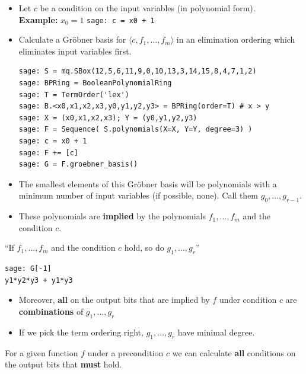 \documentclass[9pt]{beamer}
\begin{document}
\begin{frame}
\framebreak

\begin{itemize}
\item Let \(c\) be a condition on the input variables (in polynomial form).
\vspace{1em} \\
\textbf{Example:} \hspace{3em} $x_0 = 1$\hspace{3em} \lstinline{sage: c = x0 + 1}

\framebreak

\item Calculate a Gr\"obner basis for \(\langle c, f_1, \dots, f_{m}\rangle\) in an elimination ordering which eliminates input variables first.

\begin{lstlisting}
sage: S = mq.SBox(12,5,6,11,9,0,10,13,3,14,15,8,4,7,1,2)
sage: BPRing = BooleanPolynomialRing 
sage: T = TermOrder('lex')
sage: B.<x0,x1,x2,x3,y0,y1,y2,y3> = BPRing(order=T) # x > y
sage: X = (x0,x1,x2,x3); Y = (y0,y1,y2,y3)
sage: F = Sequence( S.polynomials(X=X, Y=Y, degree=3) )
sage: c = x0 + 1
sage: F += [c]
sage: G = F.groebner_basis()
\end{lstlisting}

\framebreak

\item The smallest elements of this Gr\"obner basis will be polynomials with a minimum number of input variables (if possible, none). Call them \(g_0, \dots, g_{r-1}\).

\item These polynomials are \textbf{implied} by the polynomials \(f_1, \dots, f_{m}\) and the condition \(c\).
\end{itemize}           

\begin{block}{}
\begin{center}
``If \(f_1, \dots, f_{m}\) and the condition \(c\) hold, so do \(g_1, \dots, g_{r}\)''
\end{center}
\end{block}

\begin{lstlisting}
sage: G[-1]
y1*y2*y3 + y1*y3
\end{lstlisting}


\framebreak

\begin{itemize}
\item Moreover, \textbf{all} on the output bits that are implied by \(f\) under condition \(c\) are \textbf{combinations} of \(g_1, \dots, g_{r}\)
\item If we pick the term ordering right, $g_1,\dots,g_{r}$ have minimal degree.
\end{itemize}           
\begin{block}{}
For a given function \(f\) under a precondition \(c\) we can calculate \textbf{all}  conditions on the output bits that \textbf{must} hold.
\end{block}


\end{frame}
\end{document}
